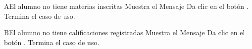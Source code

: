 
		
\begin{UCtrayectoriaA}{A}{El alumno no tiene materias inscritas}
	\UCpaso Muestra el Mensaje 
	\UCpaso[\UCactor] Da clic en el botón \IUbuttonTache .
	\UCpaso Termina el caso de uso.
\end{UCtrayectoriaA}

\begin{UCtrayectoriaA}{B}{El alumno no tiene calificaciones registradas}
	\UCpaso Muestra el Mensaje 
	\UCpaso[\UCactor] Da clic en el botón \IUbuttonTache .
	\UCpaso Termina el caso de uso.
\end{UCtrayectoriaA}

